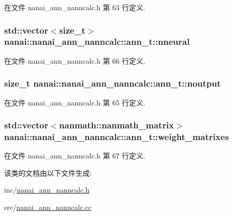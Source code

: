 在文件 nanai\+\_\+ann\+\_\+nanncalc.\+h 第 63 行定义.

\hypertarget{classnanai_1_1nanai__ann__nanncalc_1_1ann__t_a1d66bbaf003a36733135f7e43df76d90}{}
\subsubsection[{nneural}]{\setlength{\rightskip}{0pt plus 5cm}std\+::vector$<$size\+\_\+t$>$ nanai\+::nanai\+\_\+ann\+\_\+nanncalc\+::ann\+\_\+t\+::nneural}\label{classnanai_1_1nanai__ann__nanncalc_1_1ann__t_a1d66bbaf003a36733135f7e43df76d90}


在文件 nanai\+\_\+ann\+\_\+nanncalc.\+h 第 66 行定义.

\hypertarget{classnanai_1_1nanai__ann__nanncalc_1_1ann__t_aaae404e72445cd09ff003c74c41e9954}{}
\subsubsection[{noutput}]{\setlength{\rightskip}{0pt plus 5cm}size\+\_\+t nanai\+::nanai\+\_\+ann\+\_\+nanncalc\+::ann\+\_\+t\+::noutput}\label{classnanai_1_1nanai__ann__nanncalc_1_1ann__t_aaae404e72445cd09ff003c74c41e9954}


在文件 nanai\+\_\+ann\+\_\+nanncalc.\+h 第 65 行定义.

\hypertarget{classnanai_1_1nanai__ann__nanncalc_1_1ann__t_ab97f18840eabc4def4fc3c66837d0960}{}
\subsubsection[{weight\+\_\+matrixes}]{\setlength{\rightskip}{0pt plus 5cm}std\+::vector$<${\bf nanmath\+::nanmath\+\_\+matrix}$>$ nanai\+::nanai\+\_\+ann\+\_\+nanncalc\+::ann\+\_\+t\+::weight\+\_\+matrixes}\label{classnanai_1_1nanai__ann__nanncalc_1_1ann__t_ab97f18840eabc4def4fc3c66837d0960}


在文件 nanai\+\_\+ann\+\_\+nanncalc.\+h 第 67 行定义.



该类的文档由以下文件生成\+:\begin{DoxyCompactItemize}
\item 
inc/\hyperlink{nanai__ann__nanncalc_8h}{nanai\+\_\+ann\+\_\+nanncalc.\+h}\item 
src/\hyperlink{nanai__ann__nanncalc_8cc}{nanai\+\_\+ann\+\_\+nanncalc.\+cc}\end{DoxyCompactItemize}
